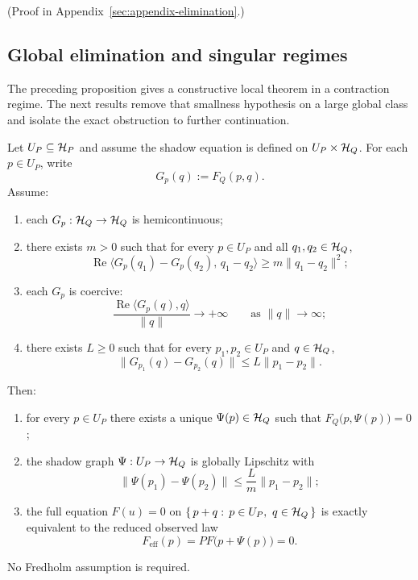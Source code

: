 (Proof in Appendix~\ref{sec:appendix-elimination}.)

\subsection{Global elimination and singular regimes}

The preceding proposition gives a constructive local theorem in a contraction
regime. The next results remove that smallness hypothesis on a large global
class and isolate the exact obstruction to further continuation.

\begin{theorem}
\label{thm:global-monotone-shadow}
Let $U_P\subseteq \mathcal{H}_P$ and assume the shadow equation is defined on
$U_P\times \mathcal{H}_Q$. For each $p\in U_P$, write
\[
G_p(q):=F_Q(p,q).
\]
Assume:
\begin{enumerate}[label=(\roman*), leftmargin=2em, itemsep=0.2em]
\item each $G_p:\mathcal{H}_Q\to\mathcal{H}_Q$ is hemicontinuous;
\item there exists $m>0$ such that for every $p\in U_P$ and all
      $q_1,q_2\in\mathcal{H}_Q$,
      \[
      \operatorname{Re}\langle G_p(q_1)-G_p(q_2),\,q_1-q_2\rangle
      \ge
      m\|q_1-q_2\|^2;
      \]
\item each $G_p$ is coercive:
      \[
      \frac{\operatorname{Re}\langle G_p(q),q\rangle}{\|q\|}
      \longrightarrow +\infty
      \qquad\text{as }\|q\|\to\infty;
      \]
\item there exists $L\ge 0$ such that for every $p_1,p_2\in U_P$ and
      $q\in\mathcal{H}_Q$,
      \[
      \|G_{p_1}(q)-G_{p_2}(q)\|\le L\|p_1-p_2\|.
      \]
\end{enumerate}
Then:
\begin{enumerate}[label=(\roman*), leftmargin=2em, itemsep=0.2em]
\item for every $p\in U_P$ there exists a unique $\Psi(p)\in\mathcal{H}_Q$ such that
      $F_Q\bigl(p,\Psi(p)\bigr)=0$;
\item the shadow graph $\Psi:U_P\to\mathcal{H}_Q$ is globally Lipschitz with
      \[
      \|\Psi(p_1)-\Psi(p_2)\|\le \frac{L}{m}\|p_1-p_2\|;
      \]
\item the full equation $F(u)=0$ on
      $\{\,p+q:\,p\in U_P,\ q\in\mathcal{H}_Q\,\}$ is exactly equivalent to the
      reduced observed law
      \[
      F_{\mathrm{eff}}(p)=P F\bigl(p+\Psi(p)\bigr)=0.
      \]
\end{enumerate}
No Fredholm assumption is required.
\end{theorem}

